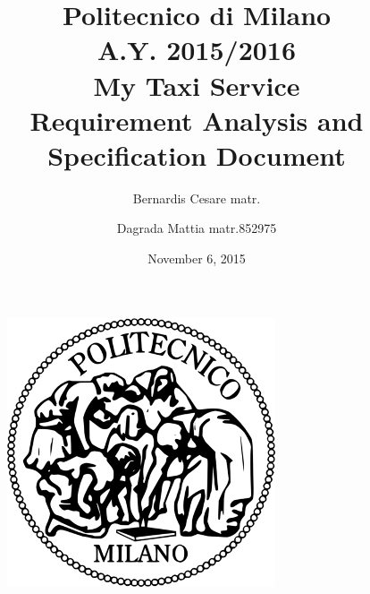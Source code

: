 \documentclass[11pt,a4paper,titlepage]{article}
\begin{document}
\begin{figure}
	\centering
	\includegraphics[scale=0.6]{../SE2_IMAGES/Logo_Politecnico_Milano}
\end{figure}
\title{Politecnico di Milano\\A.Y. 2015/2016\\\textbf{My Taxi Service}\\Requirement Analysis and Specification Document\\}
\author{Bernardis Cesare matr. \and Dagrada Mattia matr.852975}
\date{November 6, 2015}
\maketitle

\newpage

\tableofcontents

\newpage



\end{document}
